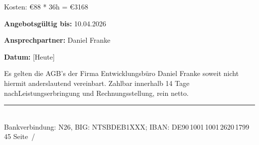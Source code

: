 \documentclass[a4paper,11pt]{article}
\begin{document}
Kosten: €88 * 36h = €3168

\textbf{Angebotsgültig bis:} 10.04.2026

\textbf{Ansprechpartner:} Daniel Franke

\textbf{Datum:} {[}Heute{]}

Es gelten die AGB's der Firma Entwicklungsbüro Daniel Franke soweit
nicht hiermit anderslautend vereinbart. Zahlbar innerhalb 14 Tage
nachLeistungserbringung und Rechnungsstellung, rein netto.

\vfill
{\color{black}\rule{\linewidth}{0.4pt}}\\[-2pt]
{\small Bankverbindung: N26, BIG: NTSBDEB1XXX; IBAN: DE90\,1001\,1001\,2620\,1799\,45
\hfill Seite~\thepage/\pageref{LastPage}}
\end{document}
